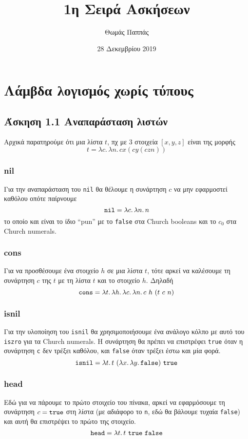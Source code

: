 \documentclass[a4paper,11pt]{article}
\newcommand\nlambda[1]{\ensuremath{\lambda #1.\,}}
\begin{document}
\title{1η Σειρά Ασκήσεων}
\author{Θωμάς Παππάς}
\date{28 Δεκεμβρίου 2019}
\maketitle

\section{Λάμβδα λογισμός χωρίς τύπους}


\subsection*{Άσκηση 1.1  Αναπαράσταση λιστών}

Αρχικά παρατηρούμε ότι μια λίστα $t$, πχ με $3$ στοιχεία $[x, y, z]$ είναι της μορφής
$$t = \nlambda{c} \nlambda{n} c x (c y (c z n))$$

\subsubsection*{nil}
Για την αναπαράσταση του \verb|nil| θα θέλουμε η συνάρτηση $c$ να μην εφαρμοστεί καθόλου οπότε παίρνουμε
$$\verb|nil| = \nlambda{c} \nlambda{n} n$$
το οποίο και είναι το ίδιο ``pun'' με το \verb|false| στα Church booleans και το $c_0$ στα Church numerals.

\subsubsection*{cons}
Για να προσθέσουμε ένα στοιχείο $h$ σε μια λίστα $t$, τότε αρκεί να καλέσουμε τη συνάρτηση $c$ της $t$ με τη λίστα $t$ και το στοιχείο $h$. Δηλαδή
$$\verb|cons| = \nlambda{t} \nlambda{h} \nlambda{c} \nlambda{n} c\ h\ (t\ c\ n)$$

\subsubsection*{isnil}
Για την υλοποίηση του \verb|isnil| θα χρησιμοποιήσουμε ένα ανάλογο κόλπο με αυτό του \verb|iszro| για τα Church numerals. Η συνάρτηση θα πρέπει να επιστρέφει \verb|true| όταν η συνάρτηση \verb|c| δεν τρέξει καθόλου, και \verb|false| όταν τρέξει έστω και μία φορά.
$$\verb|isnil| = \nlambda{t} t\ (\nlambda{x} \nlambda{y} \verb|false|)\ \verb|true|$$

\subsubsection*{head}
Εδώ για να πάρουμε το πρώτο στοιχείο του πίνακα, αρκεί να εφαρμόσουμε τη συνάρτηση $c= \verb|true|$ στη λίστα (με αδιάφορο το \verb|n|, εδώ θα βάλουμε τυχαία \verb|false|) και αυτή θα επιστρέψει το πρώτο της στοιχείο.
$$\verb|head| = \nlambda{t} t\ \verb|true|\ \verb|false|$$
\end{document}
